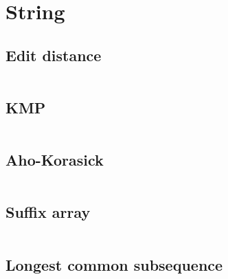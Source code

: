 \section{String}
\subsection{Edit distance}
\inputminted[frame=single,framesep=3pt,tabsize=2,breaklines=true,linenos,label=O($N^2$)]{c++}{string/edit-distance.cpp}

\subsection{KMP}
\inputminted[frame=single,framesep=3pt,tabsize=2,breaklines=true,linenos,label=O(N)]{c++}{string/kmp.cpp}

\subsection{Aho-Korasick}
\inputminted[frame=single,framesep=3pt,tabsize=2,breaklines=true,linenos,label=O(N)]{c++}{string/aho-corasick.cpp}

\subsection{Suffix array}
\inputminted[frame=single,framesep=3pt,tabsize=2,breaklines=true,linenos,label=O(N log(N)$^2$)]{c++}{string/suffix-array.cpp}

\subsection{Longest common subsequence}
\inputminted[frame=single,framesep=3pt,tabsize=2,breaklines=true,linenos,label=O(N)]{c++}{string/lcp.cpp}
